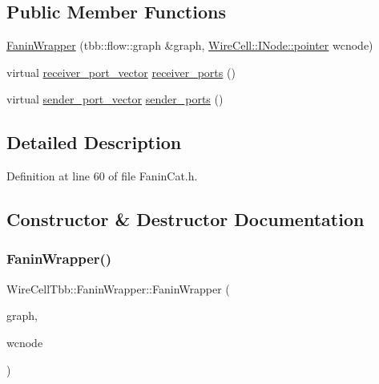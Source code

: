 \subsection*{Public Member Functions}
\begin{DoxyCompactItemize}
\item 
\hyperlink{class_wire_cell_tbb_1_1_fanin_wrapper_a3a78d98b73960e0d17eb08daabfc65df}{Fanin\+Wrapper} (tbb\+::flow\+::graph \&graph, \hyperlink{class_wire_cell_1_1_interface_a09c548fb8266cfa39afb2e74a4615c37}{Wire\+Cell\+::\+I\+Node\+::pointer} wcnode)
\item 
virtual \hyperlink{namespace_wire_cell_tbb_a87f42fe8a3ccc3bf9d315cb2d252c7af}{receiver\+\_\+port\+\_\+vector} \hyperlink{class_wire_cell_tbb_1_1_fanin_wrapper_a9aa4c230eacef36c2ebbb26fe34412c4}{receiver\+\_\+ports} ()
\item 
virtual \hyperlink{namespace_wire_cell_tbb_a99272fef0f0c33dc9d4e6e8f777b2e6e}{sender\+\_\+port\+\_\+vector} \hyperlink{class_wire_cell_tbb_1_1_fanin_wrapper_a03e6bbc3d8adc82c6203a72d615c1ba7}{sender\+\_\+ports} ()
\end{DoxyCompactItemize}


\subsection{Detailed Description}


Definition at line 60 of file Fanin\+Cat.\+h.



\subsection{Constructor \& Destructor Documentation}
\mbox{\label{class_wire_cell_tbb_1_1_fanin_wrapper_a3a78d98b73960e0d17eb08daabfc65df}} 
\subsubsection{\texorpdfstring{Fanin\+Wrapper()}{FaninWrapper()}}
{\footnotesize\ttfamily Wire\+Cell\+Tbb\+::\+Fanin\+Wrapper\+::\+Fanin\+Wrapper (\begin{DoxyParamCaption}\item[{tbb\+::flow\+::graph \&}]{graph,  }\item[{\hyperlink{class_wire_cell_1_1_interface_a09c548fb8266cfa39afb2e74a4615c37}{Wire\+Cell\+::\+I\+Node\+::pointer}}]{wcnode }\end{DoxyParamCaption})\hspace{0.3cm}{\ttfamily [inline]}}



